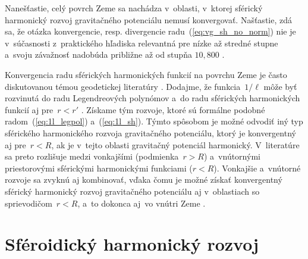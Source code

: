 \documentclass[a4paper, 12pt]{book}
\begin{document}
Nanešťastie, celý povrch Zeme sa nachádza v~oblasti, v~ktorej sférický 
harmonický rozvoj gravitačného potenciálu nemusí konvergovať.  Našťastie, zdá 
sa, že otázka konvergencie, resp. divergencie radu~(\ref{eq:vg_sh_no_norm}) nie 
je v~súčasnosti z~praktického hľadiska relevantná pre nízke až stredné stupne 
a~svoju závažnosť nadobúda približne až od stupňa $10{,}800$ 
\parencite{Hirt2016,Rexer2017}.

Konvergencia radu sférických harmonických funkcií na povrchu Zeme je často 
diskutovanou témou geodetickej literatúry 
\parencite{Hotine,Borre_chapter4,MoritzAdvancedGeodesy,Sjoberg1980,Jekeli1983,SansoGeoidDetermination}.  
Dodajme, že funkcia~$1 \slash \ell$ môže byť rozvinutá do radu Legendreových 
polynómov a~do radu sférických harmonických funkcií aj pre~$r < r'$ 
\parencite[napríklad][]{Martinec1998,MoritzPhysicalGeodesy}.  Získame tým 
rozvoje, ktoré sú formálne podobné radom~(\ref{eq:1l_legpol}) 
a~(\ref{eq:1l_sh}).  Týmto spôsobom je možné odvodiť iný typ sférického 
harmonického rozvoja gravitačného potenciálu, ktorý je konvergentný aj pre~$r 
< R$, ak je v~tejto oblasti gravitačný potenciál harmonický.  V~literatúre sa 
preto rozlišuje medzi vonkajšími (podmienka~$r > R$) a~vnútornými priestorovými 
sférickými harmonickými funkciami ($r < R$).  Vonkajšie a~vnútorné rozvoje sa 
zvyknú aj kombinovať, vďaka čomu je možné získať konvergentný sférický 
harmonický rozvoj gravitačného potenciálu aj v~oblastiach so sprievodičom~$r 
< R$, a~to dokonca aj~vo vnútri Zeme 
\parencite[napríklad][]{Sjoberg1977,Jekeli1983,Grafarend1993,Wang1997,Martinec1998,Wang2013}.






\chapter{Sféroidický harmonický rozvoj}
\label{sec:spheroidal_harmonics_chapter}
\end{document}
